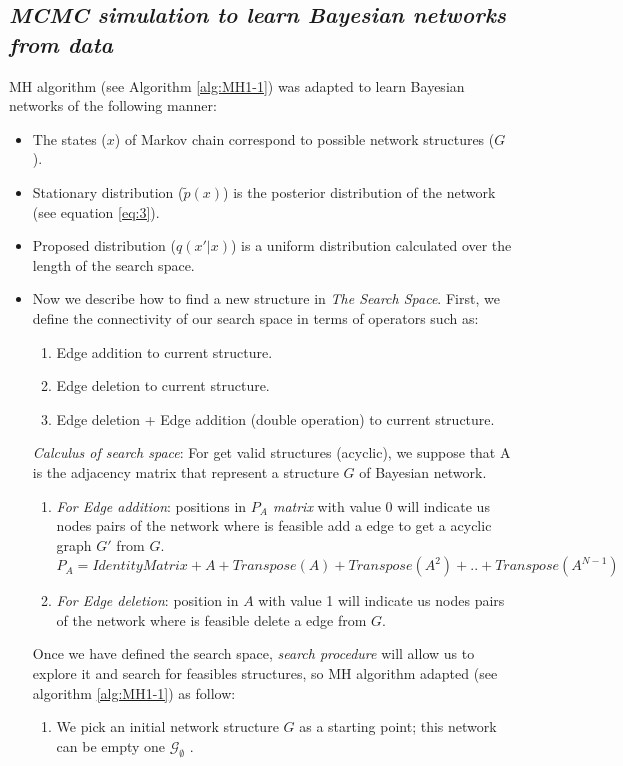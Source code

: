 \documentclass{bmcart}
\begin{document}
\subsection*{\emph{MCMC simulation to learn Bayesian networks from data}}
MH algorithm (see Algorithm \ref{alg:MH1-1}) was adapted to learn Bayesian networks of the following manner:
\begin{itemize}
\item The states ($x$) of Markov chain correspond to possible network structures ($G$).
\item Stationary distribution ($\tilde{p}(x)$) is the posterior distribution of the network (see equation \ref{eq:3}).
\item Proposed distribution ($q(x'|x)$) is a uniform distribution calculated over the length of the search space.
\item Now we describe how to find a new structure in\emph{ The Search Space}.
First, we define the connectivity of our search space in terms of operators such as: 
\begin{enumerate}
\item Edge addition to current structure.
\item Edge deletion to current structure.
\item Edge deletion + Edge addition (double operation) to current structure.
\end{enumerate}
\emph{Calculus of search space}: For get valid structures (acyclic), we suppose that A is the adjacency matrix that represent a structure $G$ of Bayesian network.
\begin{enumerate}
\item \emph{For Edge addition}: positions in \emph{$P_{A}$ matrix} with value 0 will indicate us nodes pairs of the network where is feasible add a edge to get a acyclic graph $G'$ from $G$.\\
\emph{$P_{A}=IdentityMatrix+A+Transpose(A)+Transpose(A^{2})+..+Transpose(A^{N-1})$}
\item \emph{For Edge deletion}: position in \emph{$A$} with value 1 will indicate us nodes pairs of the network where is feasible delete a edge from $G$.
\end{enumerate}
Once we have defined the search space,\emph{ search procedure} will allow us to explore it and search for feasibles structures, so MH algorithm adapted (see algorithm \ref{alg:MH1-1}) as follow:
\begin{enumerate}
\item We pick an initial network structure \emph{$G$} as a starting point; this network can be empty one \emph{$\mathcal{G}_{\emptyset}$} .

\end{enumerate}
\end{itemize}
\end{document}
